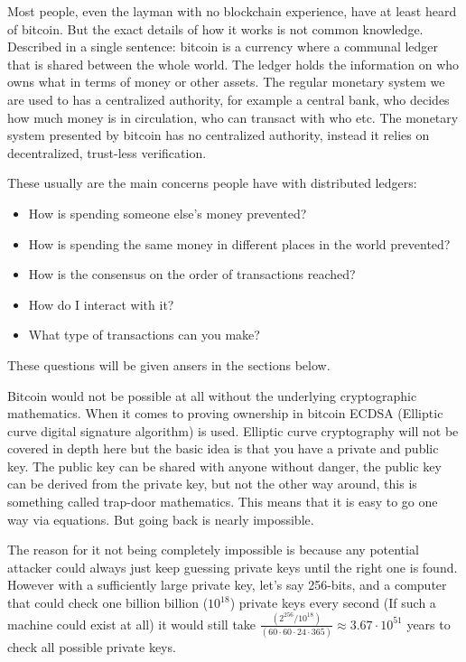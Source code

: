 Most people, even the layman with no blockchain experience, have at least heard of bitcoin. But the exact details of how it works is not common knowledge. Described in a single sentence: bitcoin is a currency where a communal ledger that is shared between the whole world. The ledger holds the information on who owns what in terms of money or other assets. The regular monetary system we are used to has a centralized authority, for example a central bank, who decides how much money is in circulation, who can transact with who etc. The monetary system presented by bitcoin has no centralized authority, instead it relies on decentralized, trust-less verification.

These usually are the main concerns people have with distributed ledgers:
\begin{itemize}
	\item How is spending someone else's money prevented?
	\item How is spending the same money in different places in the world prevented?
	\item How is the consensus on the order of transactions reached?
	\item How do I interact with it?
	\item What type of transactions can you make?
\end{itemize}

These questions will be given ansers in the sections below.

Bitcoin would not be possible at all without the underlying cryptographic mathematics. When it comes to proving ownership in bitcoin ECDSA (Elliptic curve digital signature algorithm)\cite{ecc_def} is used. Elliptic curve cryptography will not be covered in depth here but the basic idea is that you have a private and public key. The public key can be shared with anyone without danger, the public key can be derived from the private key, but not the other way around, this is something called trap-door mathematics.\cite{ecc_def}\cite{antonopoulos_2017} This means that it is easy to go one way via equations. But going back is nearly impossible. 

The reason for it not being completely impossible is because any potential attacker could always just keep guessing private keys until the right one is found. However with a sufficiently large private key, let's say 256-bits, and a computer that could check one billion billion ($10^{18}$) private keys every second (If such a machine could exist at all) it would still take $\frac{(2^{256} / 10^{18})}{(60\cdot60\cdot24\cdot365)}\approx3.67\cdot10^{51}$ years to check all possible private keys.

